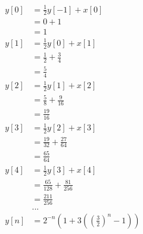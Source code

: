 \documentclass[10pt,a4paper, margin=1in]{article}
\begin{document}
\begin{enumerate}
\begin{enumerate}
\begin{align*}
        y[0] &= \frac{1}{2}y[-1] + x[0] \\
        &= 0 + 1 \\
        &= 1 \\
        y[1] &= \frac{1}{2}y[0] + x[1] \\
        &= \frac{1}{2} + \frac{3}{4} \\
        &= \frac{5}{4} \\
        y[2] &= \frac{1}{2}y[1] + x[2] \\
        &= \frac{5}{8} + \frac{9}{16} \\
        &= \frac{19}{16} \\
        y[3] &= \frac{1}{2}y[2] + x[3] \\
        &= \frac{19}{32} + \frac{27}{64} \\
        &= \frac{65}{64} \\
        y[4] &= \frac{1}{2}y[3] + x[4] \\
        &= \frac{65}{128} + \frac{81}{256} \\
        &= \frac{211}{256} \\
        &...\\
        y[n] &= 2^{-n}\left(1 + 3\left( \left(\frac{3}{2}\right)^n - 1 \right)\right)
    \end{align*}
    \end{enumerate}


\end{enumerate}
\end{document}
